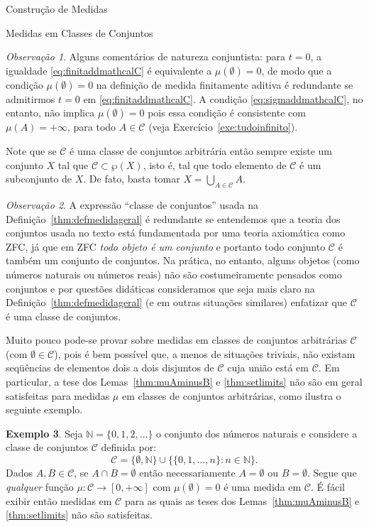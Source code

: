 \documentclass[oneside,final,11pt]{amsbook}
\newcommand{\N}{\mathds N}
\theoremstyle{remark}\newtheorem{exercise}{Exercício}[chapter]
\theoremstyle{remark}\newtheorem{*exercise}[exercise]{\hbox to 0pt{\hskip 0pt minus 1fil*}Exercício}
\theoremstyle{definition}\newtheorem{exdefin}{Definição}[chapter]
\theoremstyle{plain}\newtheorem{teo}{Teorema}[section]
\theoremstyle{plain}\newtheorem{lem}[teo]{Lema}
\theoremstyle{plain}\newtheorem{prop}[teo]{Proposição}
\theoremstyle{plain}\newtheorem{cor}[teo]{Corolário}
\theoremstyle{definition}\newtheorem{defin}[teo]{Definição}
\theoremstyle{remark}\newtheorem{rem}[teo]{Observação}
\theoremstyle{definition}\newtheorem{notation}[teo]{Notação}
\theoremstyle{definition}\newtheorem{convention}[teo]{Convenção}
\theoremstyle{definition}\newtheorem{example}[teo]{Exemplo}
\numberwithin{section}{chapter}
\numberwithin{equation}{section}
\begin{document}
\begin{chapter}{Construção de Medidas}
\begin{section}{Medidas em Classes de Conjuntos}
\begin{rem}
Alguns comentários de natureza conjuntista: para $t=0$, a igualdade \eqref{eq:finitaddmathcalC} é equivalente a
$\mu(\emptyset)=0$, de modo que a condição $\mu(\emptyset)=0$ na definição de medida
finitamente aditiva é redundante se admitirmos $t=0$ em \eqref{eq:finitaddmathcalC}. A condição \eqref{eq:sigmaddmathcalC},
no entanto, não implica $\mu(\emptyset)=0$ pois essa condição é consistente com $\mu(A)=+\infty$, para todo $A\in\mathcal C$
(veja Exercício~\ref{exe:tudoinfinito}).

Note que se $\mathcal C$ é uma classe de conjuntos arbitrária então sempre existe um conjunto $X$ tal que
$\mathcal C\subset\wp(X)$, isto é, tal que todo elemento de $\mathcal C$ é um subconjunto de $X$. De fato, basta
tomar $X=\bigcup_{A\in\mathcal C}A$.
\end{rem}

\begin{rem}
A expressão ``classe de conjuntos'' usada na Definição~\ref{thm:defmedidageral} é redundante
se entendemos que a teoria dos conjuntos usada no texto está fundamentada por uma teoria axiomática como ZFC, já que em ZFC {\em todo
objeto é um conjunto\/} e portanto todo conjunto $\mathcal C$ é também um conjunto de conjuntos. Na prática, no entanto,
alguns objetos (como números naturais ou números reais) não são costumeiramente pensados como conjuntos e por questões
didáticas consideramos que seja mais claro na Definição~\ref{thm:defmedidageral} (e em outras
situações similares) enfatizar que $\mathcal C$ é uma classe de conjuntos.
\end{rem}

Muito pouco pode-se provar sobre medidas em classes de conjuntos arbitrárias $\mathcal C$ (com $\emptyset\in\mathcal C$),
pois é bem possível que, a menos de situações triviais, não existam seqüências de elementos dois a dois disjuntos
de $\mathcal C$ cuja união está em $\mathcal C$. Em particular, a tese dos Lemas~\ref{thm:muAminusB}
e \ref{thm:setlimits} não são em geral satisfeitas para medidas $\mu$ em classes de conjuntos arbitrárias, como ilustra o seguinte
exemplo.
\begin{example}\label{exa:patolC}
Seja $\N=\{0,1,2,\ldots\}$\index[simbolos]{$\N$} o conjunto dos números naturais
e considere a classe de conjuntos $\mathcal C$ definida por:
\[\mathcal C=\{\emptyset,\N\}\cup\big\{\{0,1,\ldots,n\}:n\in\N\big\}.\]
Dados $A,B\in\mathcal C$, se $A\cap B=\emptyset$ então necessariamente $A=\emptyset$ ou $B=\emptyset$.
Segue que {\em qualquer\/} função $\mu:\mathcal C\to[0,+\infty]$ com $\mu(\emptyset)=0$ é uma medida
em $\mathcal C$. É fácil exibir então medidas em $\mathcal C$ para as quais as teses dos Lemas~\ref{thm:muAminusB}
e \ref{thm:setlimits} não são satisfeitas.
\end{example}


\end{section}
\end{chapter}
\end{document}
